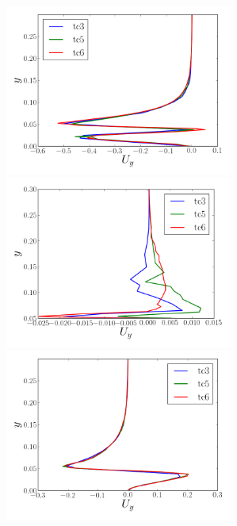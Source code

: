 \documentclass[12pt,oneside,a4paper]{article}
\begin{document}
\begin{figure}
\centering
\includegraphics[width=7.5cm]{images/CFD_meshIndependence/X1_Uy.png}\hfill \includegraphics[width=7.5cm]{images/CFD_meshIndependence/X2_Uy.png}\\
\includegraphics[width=7.5cm]{images/CFD_meshIndependence/X3_Uy.png}
\end{figure}
\end{document}
